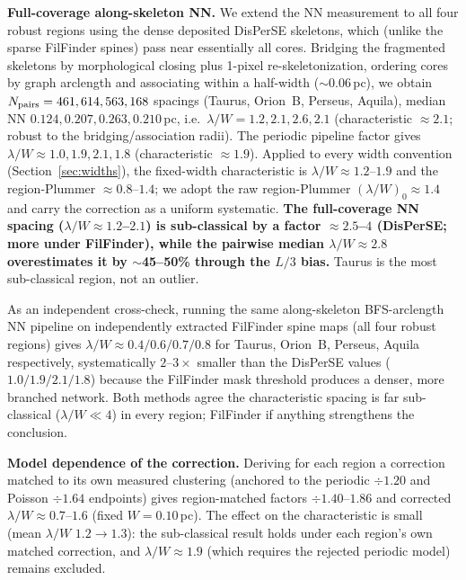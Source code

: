 \documentclass[usenatbib,twoside,twocolumn]{mnras}
\begin{document}
\textbf{Full-coverage along-skeleton NN.} We extend the NN measurement to all four robust regions using the dense deposited DisPerSE skeletons, which (unlike the sparse FilFinder spines) pass near essentially all cores. Bridging the fragmented skeletons by morphological closing plus 1-pixel re-skeletonization, ordering cores by graph arclength and associating within a half-width ($\sim$0.06\,pc), we obtain $N_{\rm pairs}=461,614,563,168$ spacings (Taurus, Orion~B, Perseus, Aquila), median NN $0.124,0.207,0.263,0.210$\,pc, i.e.\ $\lambda/W=1.2,2.1,2.6,2.1$ (characteristic $\approx2.1$; robust to the bridging/association radii). The periodic pipeline factor gives $\lambda/W\approx1.0,1.9,2.1,1.8$ (characteristic $\approx1.9$). Applied to every width convention (Section~\ref{sec:widths}), the fixed-width characteristic is $\lambda/W\approx1.2$--$1.9$ and the region-Plummer $\approx0.8$--$1.4$; we adopt the raw region-Plummer $(\lambda/W)_0\approx1.4$ and carry the correction as a uniform systematic. \textbf{The full-coverage NN spacing ($\lambda/W\approx1.2$--$2.1$) is sub-classical by a factor $\approx2.5$--$4$ (DisPerSE; more under FilFinder), while the pairwise median $\lambda/W\approx2.8$ overestimates it by $\sim$45--50\% through the $L/3$ bias.} Taurus is the most sub-classical region, not an outlier.

As an independent cross-check, running the same along-skeleton BFS-arclength NN pipeline on independently extracted FilFinder spine maps (all four robust regions) gives $\lambda/W\approx0.4/0.6/0.7/0.8$ for Taurus, Orion~B, Perseus, Aquila respectively, systematically $2$--$3\times$ smaller than the DisPerSE values ($1.0/1.9/2.1/1.8$) because the FilFinder mask threshold produces a denser, more branched network. Both methods agree the characteristic spacing is far sub-classical ($\lambda/W\ll4$) in every region; FilFinder if anything strengthens the conclusion.

\smallskip\noindent\textbf{Model dependence of the correction.}\label{sec:injection_recovery_model}
Deriving for each region a correction matched to its own measured clustering (anchored to the periodic $\div1.20$ and Poisson $\div1.64$ endpoints) gives region-matched factors $\div1.40$--$1.86$ and corrected $\lambda/W\approx0.7$--$1.6$ (fixed $W=0.10$\,pc). The effect on the characteristic is small (mean $\lambda/W$ $1.2\to1.3$): the sub-classical result holds under each region's own matched correction, and $\lambda/W\approx1.9$ (which requires the rejected periodic model) remains excluded.
\end{document}
